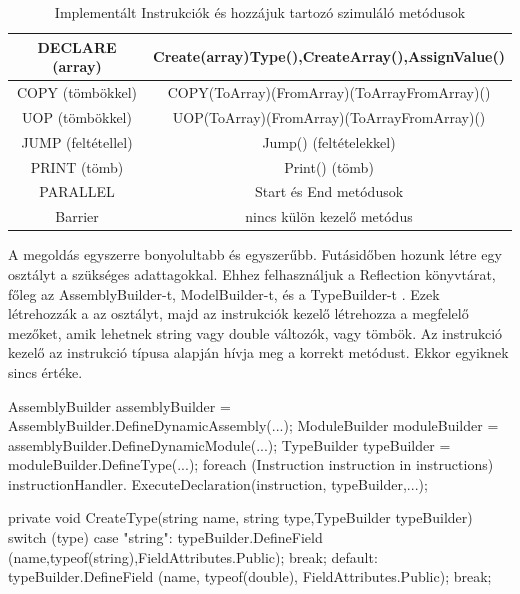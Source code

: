 \begin{table}[h]
\centering
\caption{Implementált Instrukciók és hozzájuk tartozó szimuláló metódusok}
\label{tab:instru}
\begin{tabular}{|c|c|}
\hline
DECLARE (array) & Create(array)Type(),CreateArray(),AssignValue()  \\
\hline
COPY (tömbökkel) & COPY(ToArray)(FromArray)(ToArrayFromArray)() \\
\hline
UOP (tömbökkel) & UOP(ToArray)(FromArray)(ToArrayFromArray)() \\
\hline
JUMP (feltétellel) & Jump() (feltételekkel)\\
\hline 
PRINT (tömb) & Print() (tömb) \\
\hline
PARALLEL & Start és End metódusok \\
\hline
Barrier & nincs külön kezelő metódus \\
\hline
\end{tabular}
\end{table}

A megoldás egyszerre bonyolultabb és egyszerűbb. Futásidőben hozunk létre egy osztályt a szükséges adattagokkal. Ehhez felhasználjuk a Reflection \cite{reflection} könyvtárat, főleg az AssemblyBuilder-t, ModelBuilder-t, és a TypeBuilder-t \cite{assembly_builder}. Ezek létrehozzák a az osztályt, majd az instrukciók kezelő létrehozza a megfelelő mezőket, amik lehetnek string vagy double változók, vagy tömbök. Az instrukció kezelő az instrukció típusa alapján hívja meg a korrekt metódust. Ekkor egyiknek sincs értéke.

\begin{cpp}
AssemblyBuilder assemblyBuilder = 
AssemblyBuilder.DefineDynamicAssembly(...);
ModuleBuilder moduleBuilder = 
assemblyBuilder.DefineDynamicModule(...);
TypeBuilder typeBuilder = moduleBuilder.DefineType(...);
foreach (Instruction instruction in instructions)
{
        instructionHandler.
        ExecuteDeclaration(instruction, typeBuilder,...);
}


private void CreateType(string name, string type,TypeBuilder typeBuilder)
        {
            switch (type)
            {
                case "string":
                    typeBuilder.DefineField
                    (name,typeof(string),FieldAttributes.Public);
                    break;
                default:
                    typeBuilder.DefineField
                    (name, typeof(double), FieldAttributes.Public);
                    break;
            }
        }
\end{cpp}

